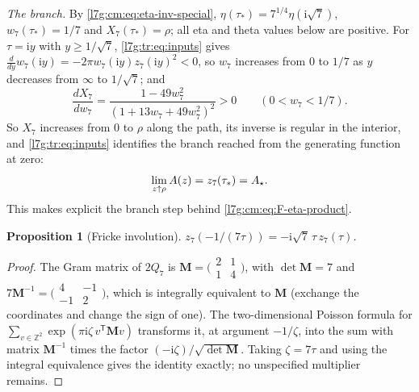 \documentclass[11pt,letterpaper]{article}
\newtheorem{proposition}[theorem]{Proposition}
\theoremstyle{remark}\newtheorem{remark}[theorem]{Remark}
\newcommand{\ii}{\mathrm i}\newcommand{\ee}{\mathrm e}
\newcounter{l7gtrsavedeq}
\begin{document}
\emph{The branch.} By \eqref{l7g:cm:eq:eta-inv-special},
$\eta(\tau_*)=7^{1/4}\eta(\ii\sqrt7)$, $w_7(\tau_*)=1/7$ and
$X_7(\tau_*)=\rho$; all eta and theta values below are positive. For
$\tau=\ii y$ with $y\ge1/\sqrt7$, \eqref{l7g:tr:eq:inputs} gives
$\frac{d}{dy}w_7(\ii y)=-2\pi w_7(\ii y)z_7(\ii y)^2<0$, so $w_7$ increases
from $0$ to $1/7$ as $y$ decreases from $\infty$ to $1/\sqrt7$; and
\[
 \frac{dX_7}{dw_7}=\frac{1-49w_7^2}{(1+13w_7+49w_7^2)^2}>0
 \qquad(0<w_7<1/7).
\]
So $X_7$ increases from $0$ to $\rho$ along the path, its inverse is
regular in the interior, and \eqref{l7g:tr:eq:inputs} identifies the branch
reached from the generating function at zero:
\begin{equation}\label{l7g:tr:eq:leftlimit}
 \lim_{z\uparrow\rho}A(z)=z_7(\tau_*)=A_\star .
\end{equation}
This makes explicit the branch step behind \eqref{l7g:cm:eq:F-eta-product}.

\begin{proposition}[Fricke involution]\label{l7g:tr:prop:fricke}
$z_7(-1/(7\tau))=-\ii\sqrt7\,\tau\,z_7(\tau)$.
\end{proposition}
\begin{proof}
The Gram matrix of $2Q_7$ is $\mathbf M=\bigl(\begin{smallmatrix}2&1\\1&4\end{smallmatrix}\bigr)$,
with $\det\mathbf M=7$ and
$7\mathbf M^{-1}=\bigl(\begin{smallmatrix}4&-1\\-1&2\end{smallmatrix}\bigr)$, which
is integrally equivalent to $\mathbf M$ (exchange the coordinates and change
the sign of one). The two-dimensional Poisson formula for
$\sum_{v\in\mathbb Z^2}\exp(\pi\ii\zeta\,v^{\mathsf T}\mathbf Mv)$ transforms it,
at argument $-1/\zeta$, into the sum with matrix $\mathbf M^{-1}$ times the
factor $(-\ii\zeta)/\sqrt{\det\mathbf M}$. Taking $\zeta=7\tau$ and using the
integral equivalence gives the identity exactly; no unspecified multiplier
remains.
\end{proof}
\end{document}
